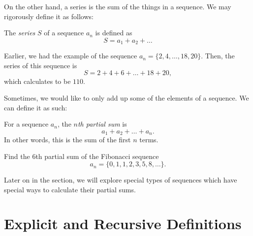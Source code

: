 On the other hand, a series is the sum of the things in a sequence. We may rigorously define it as follows:
\begin{definition}
    The \emph{series} $S$ of a sequence $a_n$ is defined as
    \[S=a_1+a_2+\dots\]
\end{definition}
\begin{example}
    Earlier, we had the example of the sequence $a_n=\{2,4,\dots,18,20\}$. Then, the series of this sequence is
    \[S=2+4+6+\dots+18+20,\]
    which calculates to be $110$.
\end{example}
Sometimes, we would like to only add up some of the elements of a sequence. We can define it as such:
\begin{definition}
    For a sequence $a_n$, the \emph{$n$th partial sum} is
    \[a_1+a_2+\dots+a_n.\]
    In other words, this is the sum of the first $n$ terms.
\end{definition}
\begin{exercise}
    Find the $6$th partial sum of the Fibonacci sequence
    \[a_n=\{0,1,1,2,3,5,8,\dots\}.\]
\end{exercise}
Later on in the section, we will explore special types of sequences which have special ways to calculate their partial sums.

\section{Explicit and Recursive Definitions}

